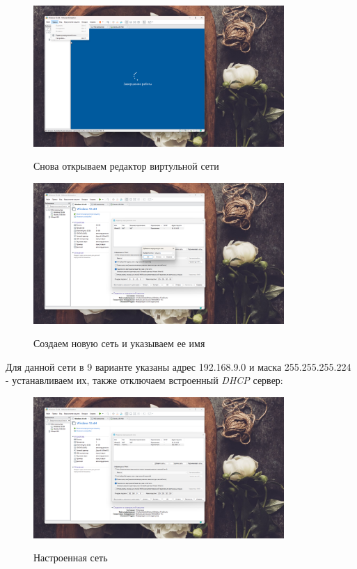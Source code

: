 \documentclass[a4paper]{article}
\begin{document}
  \begin{figure}[H]
    \centering
    \includegraphics[width=0.85\textwidth]{06_00 (40)}
    \label{img:40}
    \caption{Снова открываем редактор виртульной сети}
  \end{figure}
  
  \begin{figure}[H]
    \centering
    \includegraphics[width=0.85\textwidth]{06_00 (41)}
    \label{img:41}
    \caption{Создаем новую сеть и указываем ее имя}
  \end{figure}

  Для данной сети в 9 варианте указаны адрес 192.168.9.0 и маска 255.255.255.224 -
  устанавливаем их, также отключаем встроенный \textit{DHCP} сервер:
  
  \begin{figure}[H]
    \centering
    \includegraphics[width=0.85\textwidth]{06_00 (42)}
    \label{img:42}
    \caption{Настроенная сеть}
  \end{figure}
  
\end{document}

